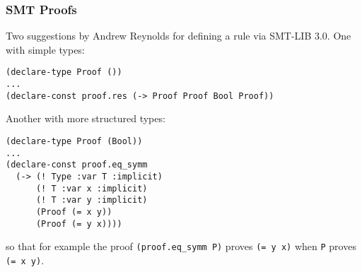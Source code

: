 \documentclass[table]{beamer}
\begin{document}
\begin{frame}
  \frametitle{SMT Proofs}

  Two suggestions by Andrew Reynolds for defining a rule via SMT-LIB 3.0. One
  with simple types:

\begin{verbatim}
(declare-type Proof ())
...
(declare-const proof.res (-> Proof Proof Bool Proof))
\end{verbatim}

Another with more structured types:

\begin{verbatim}
(declare-type Proof (Bool))
...
(declare-const proof.eq_symm
  (-> (! Type :var T :implicit)
      (! T :var x :implicit)
      (! T :var y :implicit)
      (Proof (= x y))
      (Proof (= y x))))
\end{verbatim}

    \medskip

    so that for example the proof \verb|(proof.eq_symm P)| proves \verb|(= y x)| when \verb|P| proves \verb|(= x y)|.




\end{frame}
\end{document}
